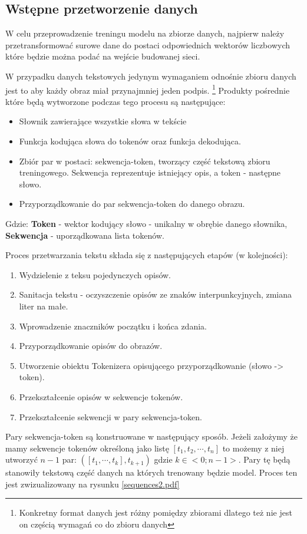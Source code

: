 \subsection{Wstępne przetworzenie danych}
W celu przeprowadzenie treningu modelu na zbiorze danych, najpierw należy przetransformować surowe dane do postaci odpowiednich wektorów liczbowych które będzie można podać na wejście budowanej sieci.

W przypadku danych tekstowych jedynym wymaganiem odnośnie zbioru danych jest to aby każdy obraz miał przynajmniej jeden podpis.
\footnote{Konkretny format danych jest różny pomiędzy zbiorami dlatego też nie jest on częścią wymagań co do zbioru danych} Produkty pośrednie które będą wytworzone podczas tego procesu są następujące:
\begin{itemize}
  \item Słownik zawierające wszystkie słowa w tekście
  \item Funkcja kodująca słowa do tokenów oraz funkcja dekodująca.
  \item Zbiór par w postaci: sekwencja-token, tworzący część tekstową zbioru treningowego. Sekwencja reprezentuje istniejący opis, a token - następne słowo.
  \item Przyporządkowanie do par sekwencja-token do danego obrazu.
\end{itemize} 
Gdzie: \textbf{Token} - wektor kodujący słowo - unikalny w obrębie danego słownika,
\textbf{Sekwencja} - uporządkowana lista tokenów.

Proces przetwarzania tekstu składa się z następujących etapów (w kolejności):
\begin{enumerate}
	\item Wydzielenie z teksu pojedynczych opisów.
	\item Sanitacja tekstu - oczyszczenie opisów ze znaków interpunkcyjnych, zmiana liter na małe.
	\item Wprowadzenie znaczników początku i końca zdania.
	\item Przyporządkowanie opisów do obrazów.
	\item Utworzenie obiektu Tokenizera opisującego przyporządkowanie (słowo -> token).
	\item Przekształcenie opisów w sekwencje tokenów.
	\item Przekształcenie sekwencji w pary sekwencja-token.
\end{enumerate}
Pary sekwencja-token są konstruowane w następujący sposób. Jeżeli założymy że mamy sekwencje tokenów określoną jako listę
$[t_1,t_2,\cdots, t_n]$ to możemy z niej utworzyć $n-1$ par: $([t_1,\cdots,t_{k}],t_{k+1})$ gdzie $k \in <0;n-1>$.
Pary tę będą stanowiły tekstową część danych na których trenowany będzie model. Proces ten jest zwizualizowany na rysunku \ref{sequences2.pdf}

